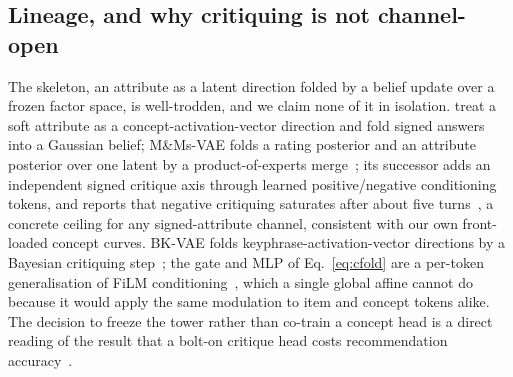 \documentclass[manuscript,screen]{acmart}
\begin{document}
\subsection{Lineage, and why critiquing is not channel-open}\label{sec:concept:lineage}

The skeleton, an attribute as a latent direction folded by a belief update over a frozen factor space, is well-trodden, and we claim none of it in isolation. \citet{biyik2023soft} treat a soft attribute as a concept-activation-vector direction and fold signed answers into a Gaussian belief; M\&Ms-VAE folds a rating posterior and an attribute posterior over one latent by a product-of-experts merge~\citep{antognini2021mmvae}; its successor adds an independent signed critique axis through learned positive/negative conditioning tokens, and reports that negative critiquing saturates after about five turns~\citep{antognini2022posneg}, a concrete ceiling for any signed-attribute channel, consistent with our own front-loaded concept curves. BK-VAE folds keyphrase-activation-vector directions by a Bayesian critiquing step~\citep{yang2021bkvae}; the gate and MLP of Eq.~\eqref{eq:cfold} are a per-token generalisation of FiLM conditioning~\citep{perez2018film}, which a single global affine cannot do because it would apply the same modulation to item and concept tokens alike. The decision to freeze the tower rather than co-train a concept head is a direct reading of the result that a bolt-on critique head costs recommendation accuracy~\citep{wu2019dlc,luo2020cevae}.
\end{document}
